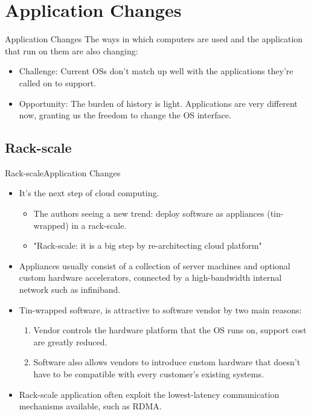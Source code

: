 \documentclass[10pt]{beamer}
\begin{document}
\section{Application Changes}
\begin{frame}{Application Changes}
The ways in which computers are used and the application that run on them are
also changing:

  \begin{itemize}
    \item Challenge: Current OSs don't match up well with the applications
          they're called on to support.
    \item Opportunity: The burden of history is light. Applications are very
          different now, granting us the freedom to change the OS interface.
  \end{itemize}
\end{frame}

\subsection{Rack-scale}
\begin{frame}{Rack-scale}{Application Changes}
  \begin{itemize}
    \item It's the next step of cloud computing.
    \begin{itemize}
      \item The authors seeing a new trend: deploy software as appliances
            (tin-wrapped) in a rack-scale.
      \item "Rack-scale: it is a big step by re-architecting cloud platform"
    \end{itemize}
    \item Appliances usually consist of a collection of server machines and
          optional custom hardware accelerators, connected by a high-bandwidth
          internal network such as infiniband.
    \item Tin-wrapped software, is attractive to software vendor by two main
          reasons:
      \begin{enumerate}
        \item Vendor controls the hardware platform that the OS runs on,
               support cost are greatly reduced.
        \item Software also allows vendors to introduce custom hardware that
              doesn't have to be compatible with every customer's existing
              systems.
      \end{enumerate}
    \item Rack-scale application often exploit the lowest-latency communication
          mechanisms available, such as RDMA.
  \end{itemize}
\end{frame}
\end{document}
